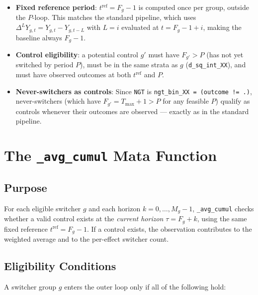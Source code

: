 \documentclass[11pt]{article}
\begin{document}
\begin{itemize}[nosep]
  \item \textbf{Fixed reference period}: $t^{\text{ref}} = F_g - 1$ is
        computed once per group, outside the $P$-loop. This matches the
        standard pipeline, which uses $\Delta^L Y_{g,t} = Y_{g,t} -
        Y_{g,t-L}$ with $L = i$ evaluated at $t = F_g - 1 + i$, making
        the baseline always $F_g - 1$.

  \item \textbf{Control eligibility}: a potential control $g'$ must have
        $F_{g'} > P$ (has not yet switched by period $P$), must be in the
        same strata as $g$ (\texttt{d\_sq\_int\_XX}), and must have observed
        outcomes at both $t^{\text{ref}}$ and $P$.

  \item \textbf{Never-switchers as controls}: Since \texttt{NGT} is
        \texttt{ngt\_bin\_XX = (outcome != .)}, never-switchers (which have
        $F_{g'} = T_{\max}+1 > P$ for any feasible $P$) qualify as controls
        whenever their outcomes are observed --- exactly as in the standard
        pipeline.
\end{itemize}

\section{The \texttt{\_avg\_cumul} Mata Function}

\subsection{Purpose}

For each eligible switcher $g$ and each horizon $k = 0,\dots,M_g-1$,
\texttt{\_avg\_cumul} checks whether a valid control exists at the
\emph{current horizon} $\tau = F_g + k$, using the same fixed reference
$t^{\text{ref}} = F_g - 1$. If a control exists, the observation contributes
to the weighted average and to the per-effect switcher count.

\subsection{Eligibility Conditions}

A switcher group $g$ enters the outer loop only if all of the following hold:
\end{document}
